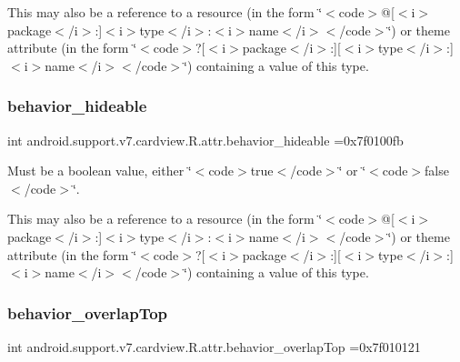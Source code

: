 This may also be a reference to a resource (in the form \char`\"{}$<$code$>$@\mbox{[}$<$i$>$package$<$/i$>$\+:\mbox{]}$<$i$>$type$<$/i$>$\+:$<$i$>$name$<$/i$>$$<$/code$>$\char`\"{}) or theme attribute (in the form \char`\"{}$<$code$>$?\mbox{[}$<$i$>$package$<$/i$>$\+:\mbox{]}\mbox{[}$<$i$>$type$<$/i$>$\+:\mbox{]}$<$i$>$name$<$/i$>$$<$/code$>$\char`\"{}) containing a value of this type. \mbox{\label{classandroid_1_1support_1_1v7_1_1cardview_1_1R_1_1attr_a060d2bd5ef674ba58f9bdd768f7339db}} 
\subsubsection{\texorpdfstring{behavior\+\_\+hideable}{behavior\_hideable}}
{\footnotesize\ttfamily int android.\+support.\+v7.\+cardview.\+R.\+attr.\+behavior\+\_\+hideable =0x7f0100fb\hspace{0.3cm}{\ttfamily [static]}}

Must be a boolean value, either \char`\"{}$<$code$>$true$<$/code$>$\char`\"{} or \char`\"{}$<$code$>$false$<$/code$>$\char`\"{}. 

This may also be a reference to a resource (in the form \char`\"{}$<$code$>$@\mbox{[}$<$i$>$package$<$/i$>$\+:\mbox{]}$<$i$>$type$<$/i$>$\+:$<$i$>$name$<$/i$>$$<$/code$>$\char`\"{}) or theme attribute (in the form \char`\"{}$<$code$>$?\mbox{[}$<$i$>$package$<$/i$>$\+:\mbox{]}\mbox{[}$<$i$>$type$<$/i$>$\+:\mbox{]}$<$i$>$name$<$/i$>$$<$/code$>$\char`\"{}) containing a value of this type. \mbox{\label{classandroid_1_1support_1_1v7_1_1cardview_1_1R_1_1attr_a3f74f7edc2044d09a9f4bf782fc271dc}} 
\subsubsection{\texorpdfstring{behavior\+\_\+overlap\+Top}{behavior\_overlapTop}}
{\footnotesize\ttfamily int android.\+support.\+v7.\+cardview.\+R.\+attr.\+behavior\+\_\+overlap\+Top =0x7f010121\hspace{0.3cm}{\ttfamily [static]}}

